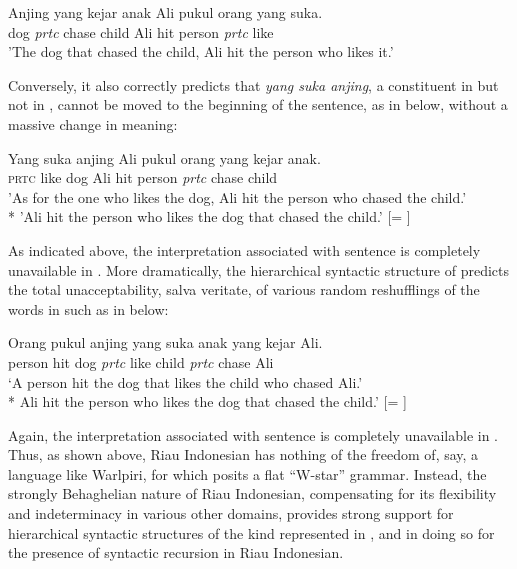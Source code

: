 \documentclass[output=paper,colorlinks,citecolor=brown
]{langscibook}
\begin{document}
\ea \label{ex:gil:2}
\gll Anjing	yang	kejar	anak	Ali	pukul	orang	yang	suka.\\
 dog	\textit{prtc}	chase	child	Ali	hit	person	\textit{prtc}	like	\\
\glt 'The dog that chased the child, Ali hit the person who likes it.'
\z

Conversely, it also correctly predicts that \textit{yang suka anjing}, a constituent in  but not in , cannot be moved to the beginning of the sentence, as in  below, without a massive change in meaning:

\ea \label{ex:gil:3}
\gll Yang	suka	anjing	Ali	pukul	orang	yang	kejar	anak.\\
 \textsc{prtc}	like	dog	Ali	hit	person	\textit{prtc}	chase	child\\
\glt 'As for the one who likes the dog, Ali hit the person who chased the child.' \\
*	'Ali hit the person who likes the dog that chased the child.' [= ]
\z

As indicated above, the interpretation associated with sentence  is completely unavailable in .  More dramatically, the hierarchical syntactic structure of  predicts the total unacceptability, salva veritate, of various random reshufflings of the words in  such as in  below:

\ea \label{ex:gil:4}
\gll Orang	pukul	anjing	yang	suka	anak	yang	kejar	Ali. \\
    person	hit	dog	\textit{prtc}	like	child	\textit{prtc}	chase	Ali\\
\glt `A person hit the dog that likes the child who chased Ali.' \\
*	Ali hit the person who likes the dog that chased the child.' [= ]
\z

Again, the interpretation associated with sentence  is completely unavailable in .  Thus, as shown above, Riau Indonesian has nothing of the freedom of, say, a language like Warlpiri, for which \citet{hale1979position, hale1983warlpiri} posits a flat ``W-star'' grammar. Instead, the strongly Behaghelian nature of Riau Indonesian, compensating for its flexibility and indeterminacy in various other domains, provides strong support for hierarchical syntactic structures of the kind represented in , and in doing so for the presence of syntactic recursion in Riau Indonesian.
\end{document}
